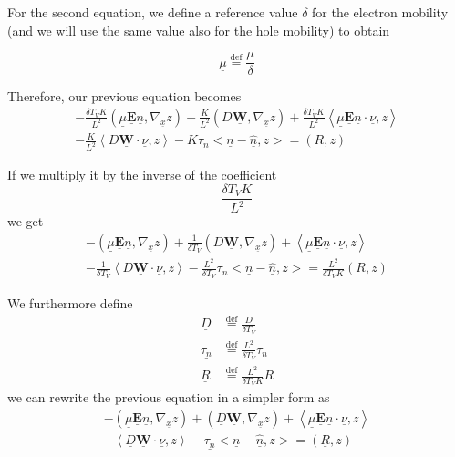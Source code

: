 \documentclass[a4paper,12pt, draft]{article}
\newcommand{\Def}{\stackrel{\mathrm{def}}{=}}
\newcommand{\efield}{\ensuremath{\mathbf{E}}}
\newcommand{\displ}{\ensuremath{\mathbf{W}}}
\newcommand{\cmagn}{\ensuremath{K}}
\newcommand{\muref}{\ensuremath{\delta}}
\newcommand{\adim}[1]{\ensuremath{\underline{#1}}}
\begin{document}
For the second equation, we define a reference value $\muref$ for the electron mobility 
(and we will use the same value also for the hole mobility) to obtain

\[ \adim{\mu} \Def \frac{\mu}{\muref} \]

Therefore, our previous equation becomes
\[
  \begin{multlined}
  -  \frac{\muref T_{V} \cmagn}{L^2} \left(
      \adim{\mu} \adim{\efield} \adim{n}, \nabla_{\adim{x}} z
    \right)
    +  \frac{\cmagn}{L^2}\left(D \adim{\displ}, \nabla_{\adim{x}} z \right)
    + \frac{\muref T_{V} \cmagn}{L^2}\left<
        \adim{\mu} \adim{\efield} \adim{n} \cdot \adim{\nu}, z
      \right> \\
    - \frac{\cmagn}{L^2}\left<D \adim{\displ} \cdot \adim{\nu}, z \right> 
    - \cmagn \tau_{n} \big<\adim{n} - \adim{\widehat{n}}, z \big> = \left( R, z \right)
  \end{multlined}
\]

If we multiply it by the inverse of the coefficient
\[ \frac{\muref T_{V} \cmagn}{L^2} \]
we get
\[
  \begin{multlined}
  -  \left(
      \adim{\mu} \adim{\efield} \adim{n}, \nabla_{\adim{x}} z
    \right)
    +  \frac{1}{\muref T_{V}}\left(D \adim{\displ}, \nabla_{\adim{x}} z \right)
    + \left<
        \adim{\mu} \adim{\efield} \adim{n} \cdot \adim{\nu}, z
      \right> \\
    - \frac{1}{\muref T_{V}}\left<D \adim{\displ} \cdot \adim{\nu}, z \right> 
    - \frac{L^2}{\muref T_{V}} \tau_{n} \big<\adim{n} - \adim{\widehat{n}}, z \big>
    = \frac{L^2}{\muref T_{V} \cmagn} \left( R, z \right)
  \end{multlined}
\]

We furthermore define
\begin{align*}
  \adim{D} & \Def \frac{D}{\muref T_{V}} \\
  \adim{\tau_n} & \Def \frac{L^2}{\muref T_{V}} \tau_n \\
  \adim{R} & \Def \frac{L^2}{\muref T_{V} \cmagn} R
\end{align*}
we can rewrite the previous equation in a simpler form as
\[
  \begin{multlined}
  -  \left(
      \adim{\mu} \adim{\efield} \adim{n}, \nabla_{\adim{x}} z
    \right)
    +  \left(\adim{D} \adim{\displ}, \nabla_{\adim{x}} z \right)
    + \left<
        \adim{\mu} \adim{\efield} \adim{n} \cdot \adim{\nu}, z
      \right> \\[5pt]
    - \left< \adim{D} \adim{\displ} \cdot \adim{\nu}, z \right> 
    - \adim{\tau_{n}} \big<\adim{n} - \adim{\widehat{n}}, z \big>
    = \left( \adim{R}, z \right)
  \end{multlined}
\]
\end{document}
